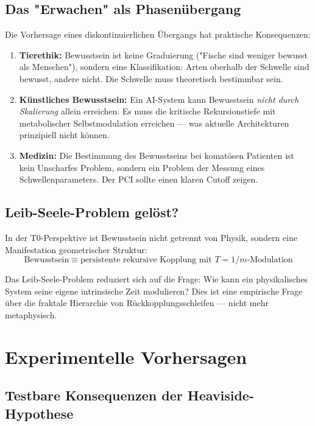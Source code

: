 \documentclass[11pt,a4paper]{article}
\begin{document}
	\subsection{Das "Erwachen" als Phasenübergang}
	
	Die Vorhersage eines diskontinuierlichen Übergangs hat praktische Konsequenzen:
	
	\begin{enumerate}
		\item \textbf{Tierethik:} Bewusstsein ist keine Graduierung ("Fische sind weniger bewusst als Menschen"), sondern eine Klassifikation: Arten oberhalb der Schwelle sind bewusst, andere nicht. Die Schwelle muss theoretisch bestimmbar sein.
		
		\item \textbf{Künstliches Bewusstsein:} Ein AI-System kann Bewusstsein \emph{nicht durch Skalierung} allein erreichen. Es muss die kritische Rekursionstiefe mit metabolischer Selbstmodulation erreichen — was aktuelle Architekturen prinzipiell nicht können.
		
		\item \textbf{Medizin:} Die Bestimmung des Bewusstseins bei komatösen Patienten ist kein Unscharfes Problem, sondern ein Problem der Messung eines Schwellenparameters. Der PCI sollte einen klaren Cutoff zeigen.
	\end{enumerate}
	
	\subsection{Leib-Seele-Problem gelöst?}
	
	In der T0-Perspektive ist Bewusstsein nicht getrennt von Physik, sondern eine Manifestation geometrischer Struktur:
	\[
	\text{Bewusstsein} \equiv \text{persistente rekursive Kopplung mit } T = 1/m\text{-Modulation}
	\]
	
	Das Leib-Seele-Problem reduziert sich auf die Frage: Wie kann ein physikalisches System seine eigene intrinsische Zeit modulieren? Dies ist eine empirische Frage über die fraktale Hierarchie von Rückkopplungsschleifen — nicht mehr metaphysisch.
	
	\section{Experimentelle Vorhersagen}
	\label{sec:vorhersagen}
	
	\subsection{Testbare Konsequenzen der Heaviside-Hypothese}
	
\end{document}
